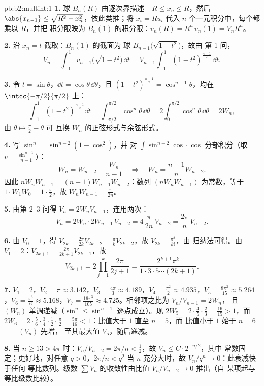 \begin{solution}{pb:b2:multint:1}
\textbf{1.} 球 $B_n(R)$ 由逐次界描述
$-R \leq x_n \leq R$，然后 $\abs{x_{n-1}} \leq \sqrt{R^2 -
x_n^2}$，依此类推；将 $x_i = Ru_i$ 代入
$n$ 个一元积分中，每个都乘以 $R$，并把
积分限映为 $B_n(1)$ 的积分限：$v_n(R) = R^n\,v_n(1) =
V_nR^n$。

\textbf{2.} 沿 $x_n = t$ 截取：$B_n(1)$ 的截面为
球 $B_{n-1}\bigl(\sqrt{1 - t^2}\bigr)$，故由
第 1 问，
\[
V_n = \int_{-1}^1 v_{n-1}\bigl(\sqrt{1 - t^2}\bigr)\,\dd t
= V_{n-1}\int_{-1}^{1}(1 - t^2)^{\frac{n-1}2}\,\dd t .
\]

\textbf{3.} 令 $t = \sin\theta$，$\dd t =
\cos\theta\,\dd\theta$，且 $(1 - t^2)^{\frac{n-1}2} =
\cos^{n-1}\theta$，均在 $\intcc{-\pi/2}{\pi/2}$ 上：
\[
\int_{-1}^1(1 - t^2)^{\frac{n-1}2}\dd t
= \int_{-\pi/2}^{\pi/2}\cos^n\theta\,\dd\theta
= 2\int_0^{\pi/2}\cos^n\theta\,\dd\theta = 2W_n,
\]
由 $\theta \mapsto \frac\pi2 - \theta$ 可
互换 $W_n$ 的正弦形式与余弦形式。

\textbf{4.} 写 $\sin^n = \sin^{n-2}(1 - \cos^2)$，并
对 $\int\sin^{n-2}\cos\cdot\cos$ 分部积分（取 $v =
\frac{\sin^{n-1}}{n-1}$）：
\[
W_n = W_{n-2} - \frac{W_n}{n-1}
\quad\Longrightarrow\quad
W_n = \frac{n-1}{n}W_{n-2}.
\]
因此 $nW_nW_{n-1} = (n-1)W_{n-1}W_{n-2}$：数列
$(nW_nW_{n-1})$ 为常数，等于 $1\cdot W_1W_0 =
1\cdot\frac\pi2$，故 $W_nW_{n-1} = \frac{\pi}{2n}$。

\textbf{5.} 由第 2--3 问得 $V_n = 2W_nV_{n-1}$，连用两次：
\[
V_n = 2W_n\cdot 2W_{n-1}\,V_{n-2}
= 4\,\frac{\pi}{2n}\,V_{n-2} = \frac{2\pi}n\,V_{n-2}.
\]

\textbf{6.} 由 $V_0 = 1$，得 $V_{2k} = \frac{2\pi}{2k}V_{2k-2}
= \frac\pi kV_{2k-2}$，故 $V_{2k} = \frac{\pi^k}{k!}$，由
归纳法可得。由 $V_1 = 2$：$V_{2k+1} =
\frac{2\pi}{2k+1}V_{2k-1}$，故
\[
V_{2k+1} = 2\prod_{j=1}^k\frac{2\pi}{2j+1}
= \frac{2^{k+1}\pi^k}{1\cdot3\cdot5\cdots(2k+1)} .
\]

\textbf{7.} $V_1 = 2$，$V_2 = \pi \approx 3.142$，$V_3 =
\frac{4\pi}3 \approx 4.189$，$V_4 = \frac{\pi^2}2 \approx
4.935$，$V_5 = \frac{8\pi^2}{15} \approx 5.264$，$V_6 =
\frac{\pi^3}6 \approx 5.168$，$V_7 = \frac{16\pi^3}{105}
\approx 4.725$。相邻项之比为 $V_n/V_{n-1} = 2W_n$，
且 $(W_n)$ 单调递减（$\sin^n \leq \sin^{n-1}$
逐点成立）。现 $2W_5 = 2\cdot\frac45\cdot\frac23 =
\frac{16}{15} > 1$，而 $2W_6 =
2\cdot\frac56\cdot\frac34\cdot\frac12\cdot\frac\pi2 =
\frac{5\pi}{16} < 1$：比值大于 $1$ 直至 $n = 5$，而
比值小于 $1$ 始于 $n = 6$——$(V_n)$ 先增，
至其最大值 $V_5$，随后递减。

\textbf{8.} 当 $n \geq 13 > 4\pi$ 时：$V_n/V_{n-2} = 2\pi/n <
\tfrac12$，故 $V_{n} \leq C\cdot 2^{-n/2}$，其中
常数固定；更好地，对任意 $q > 0$，$2\pi/n < q^2$ 当
$n$ 充分大时，故 $V_n/q^n \to 0$：此衰减快于任何
等比数列。级数 $\sum V_n$ 的收敛性由比值
$V_n/V_{n-2} \to 0$ 推出（自
某项起与等比级数比较）。


\end{solution}
